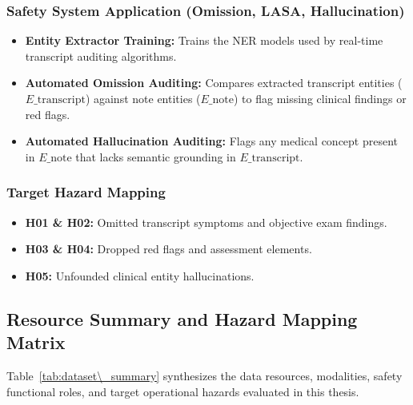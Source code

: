 \subsubsection*{Safety System Application (Omission, LASA, Hallucination)}
\begin{itemize}
    \item \textbf{Entity Extractor Training:} Trains the NER models used by real-time transcript auditing algorithms.
    \item \textbf{Automated Omission Auditing:} Compares extracted transcript entities ($E\_{\text{transcript}}$) against note entities ($E\_{\text{note}}$) to flag missing clinical findings or red flags.
    \item \textbf{Automated Hallucination Auditing:} Flags any medical concept present in $E\_{\text{note}}$ that lacks semantic grounding in $E\_{\text{transcript}}$.
\end{itemize}

\subsubsection*{Target Hazard Mapping}
\begin{itemize}
    \item \textbf{H01 \& H02:} Omitted transcript symptoms and objective exam findings.
    \item \textbf{H03 \& H04:} Dropped red flags and assessment elements.
    \item \textbf{H05:} Unfounded clinical entity hallucinations.
\end{itemize}



\subsection{Resource Summary and Hazard Mapping Matrix}
\label{subsec:dataset\_summary\_matrix}

Table~\ref{tab:dataset\_summary} synthesizes the data resources, modalities, safety functional roles, and target operational hazards evaluated in this thesis.

